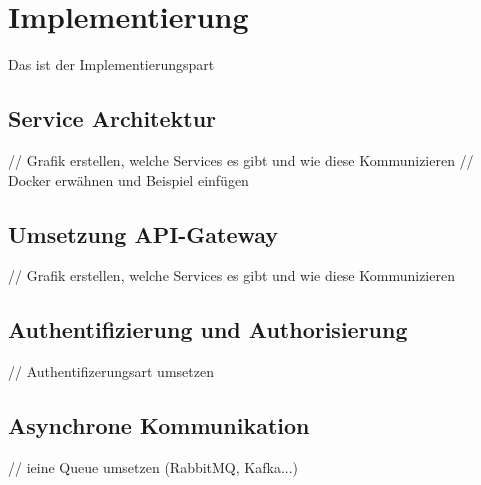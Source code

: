 \section{Implementierung}
Das ist der Implementierungspart


\subsection{Service Architektur}
// Grafik erstellen, welche Services es gibt und wie diese Kommunizieren 
// Docker erwähnen und Beispiel einfügen

\subsection{Umsetzung API-Gateway}
// Grafik erstellen, welche Services es gibt und wie diese Kommunizieren 

\subsection{Authentifizierung und Authorisierung}
// Authentifizerungsart umsetzen

\subsection{Asynchrone  Kommunikation}
// ieine Queue umsetzen (RabbitMQ, Kafka...)

